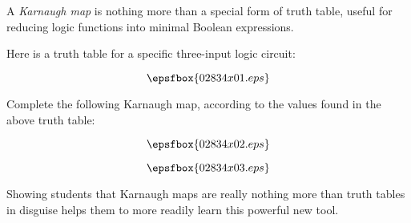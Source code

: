 

A {\it Karnaugh map} is nothing more than a special form of truth table, useful for reducing logic functions into minimal Boolean expressions.

Here is a truth table for a specific three-input logic circuit:

$$\epsfbox{02834x01.eps}$$

Complete the following Karnaugh map, according to the values found in the above truth table:

$$\epsfbox{02834x02.eps}$$







$$\epsfbox{02834x03.eps}$$







Showing students that Karnaugh maps are really nothing more than truth tables in disguise helps them to more readily learn this powerful new tool.




